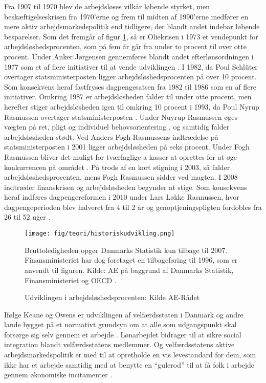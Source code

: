 Fra 1907 til 1970 blev de arbejdsløses vilkår løbende styrket, men beskæftigelseskrisen fra 1970'erne og frem til midten af 1990'erne medfører en mere aktiv arbejdsmarkedspolitik end tidligere, der blandt andet indebar løbende besparelser. Som det fremgår af figur \ref{fig_udvikl.arbejdsloeshed}, så er Oliekrisen i 1973 et vendepunkt for arbejdsløshedsprocenten, som på fem år går fra under to procent til over otte procent. Under Anker Jørgensen gennemføres blandt andet efterlønsordningen i 1977 som et af flere initiativer til at vende udviklingen \parencite[86]{Pedersen2007}. I 1982, da Poul Schlüter overtager statsministerposten ligger arbejdsløshedsprocenten på over 10 procent. Som konsekvens heraf fastfryses dagpengesatsen fra 1982 til 1986 som en af flere initiativer. Omkring 1987 er arbejdsløsheden falder til under otte procent, men herefter stiger arbejdsløsheden igen til omkring 10 procent i 1993, da Poul Nyrup Rasmussen overtager statsministerposten \parencite[88]{Pedersen2007}. Under Nuyrup Rasmussen øges vægten på ret, pligt og individuel behovsorientering \parencite[92]{Pedersen2007}, og samtidig falder arbejdsløsheden stødt. Ved Anders Fogh Rasmussens indtrædelse på statsministerposten i 2001 ligger arbejdsløsheden på seks procent. Under Fogh Rasmussen bliver det muligt for tværfaglige a-kasser at oprettes for at øge konkurrencen på området \parencite[97]{Pedersen2007}. På trods af en kort stigning i 2003, så falder arbejdsløshedsprocenten, mens Fogh Rasmussen sidder ved magten. I 2008 indtræder finanskrisen og arbejdsløsheden begynder at stige. Som konsekvens heraf indføres dagpengereformen i 2010 under Lars Løkke Rasmussen, hvor dagpengeperioden blev halveret fra 4 til 2 år og genoptjeningspligten fordobles fra 26 til 52 uger \parencite{lov_dagpenge}. %
% 
\begin{figure}[H]
\begin{centering}
	\caption{Udviklingen i arbejdsløshedsprocenten: Kilde AE-Rådet}
	\texttt{[image: fig/teori/historiskudvikling.png]}

	\footnotesize{Bruttoledigheden opgør Danmarks Statistik kun tilbage til 2007. Finansministeriet har dog foretaget en tilbageføring til 1996, som er anvendt til figuren. Kilde: AE på baggrund af Danmarks Statistik, Finansministeriet og OECD \parencite[2]{Bjoersted2012}.}
	\label{fig_udvikl.arbejdsloeshed}
\end{centering}
\end{figure}
% 
Ifølge Keane og Owens er udviklingen af velfærdsstaten i Danmark og andre lande bygget på et normativt grundsyn om at alle som udgangspunkt skal forsørge sig selv gennem et arbejde \textbf{\parencite[18]{Keane1986}}. Lønarbejdet bidrager til at sikre social integration blandt velfærdsstatens medlemmer. Og velfærdsstatens aktive arbejdsmarkedspolitik er med til at opretholde en vis levestandard for dem, som ikke har et arbejde samtidig med at benytte en “gulerod” til at få folk i arbejde gennem økonomiske incitamenter \textbf{\parencite[7]{Halvorsen1999}}. %


